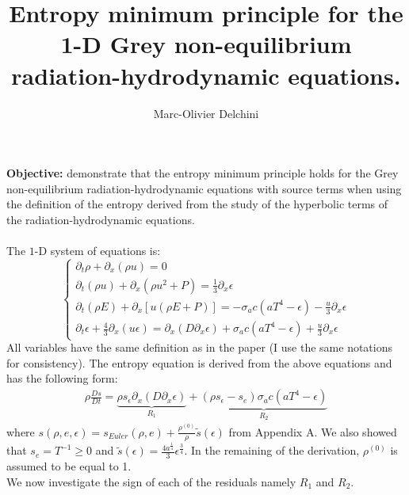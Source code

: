 \documentclass{article}
\title{Entropy minimum principle for the 1-D Grey non-equilibrium radiation-hydrodynamic equations.}
\author{Marc-Olivier Delchini}
\begin{document}
\maketitle
\noindent
\textbf{Objective:} demonstrate that the entropy minimum principle holds for the Grey non-equilibrium radiation-hydrodynamic equations with source terms when using the definition of the entropy derived from the study of the hyperbolic terms of the radiation-hydrodynamic equations.
\\
\\
The $1$-D system of equations is: 
%
\begin{equation}
\label{eq:radhydro}
\left\{
\begin{array}{llll}
\partial_t \rho + \partial_x \left( \rho u \right) = 0\\
\partial_t \left( \rho u \right) + \partial_x \left( \rho u^2 + P \right) = \frac{1}{3} \partial_x \epsilon \\
\partial_t \left( \rho E \right) + \partial_x \left[ u \left(\rho E + P \right) \right] = - \sigma_a c \left( a T^4 - \epsilon \right) - \frac{u}{3} \partial_x \epsilon \\
\partial_t \epsilon + \frac{4}{3} \partial_x \left( u \epsilon  \right) = \partial_x \left( D \partial_x \epsilon \right) + \sigma_a c \left( a T^4 - \epsilon \right) + \frac{u}{3} \partial_x \epsilon 
\end{array}
\right.
\end{equation}
All variables have the same definition as in the paper (I use the same notations for consistency). The entropy equation is derived from the above equations and has the following form:
%
\begin{align}
\rho \frac{Ds}{Dt} = \underbrace{\rho s_\epsilon \partial_x \left( D \partial_x \epsilon \right)}_{R_1} + \underbrace{\left( \rho s_\epsilon - s_e  \right) \sigma_a c \left( a T^4 - \epsilon \right)}_{R_2} \nonumber
\end{align}
%
where $s(\rho, e, \epsilon) = s_{Euler} (\rho,e) + \frac{\rho^{(0)}}{\rho}\tilde{s}(\epsilon)$ from Appendix A. We also showed that $s_e = T^{-1} \geq 0$ and $\tilde{s}(\epsilon) = \frac{4 a^\frac{1}{4}}{3} \epsilon^\frac{3}{4}$. In the remaining of the derivation, $\rho^{(0)}$ is assumed to be equal to 1.\\
We now investigate the sign of each of the residuals namely $R_1$ and $R_2$.
%
\end{document}
